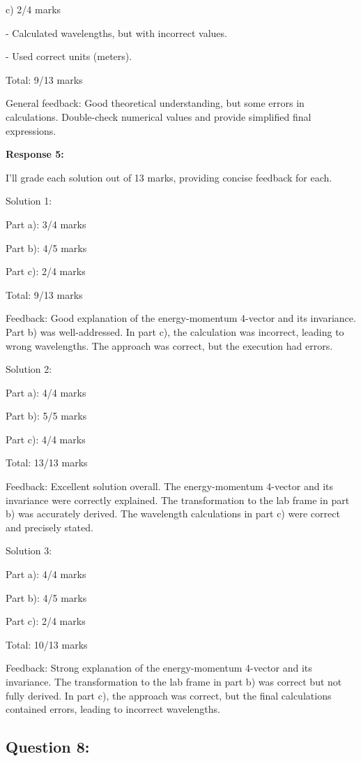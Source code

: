 \documentclass[a4paper,11pt]{article}
\begin{document}
c) 2/4 marks

- Calculated wavelengths, but with incorrect values.

- Used correct units (meters).

Total: 9/13 marks

General feedback: Good theoretical understanding, but some errors in calculations. Double-check numerical values and provide simplified final expressions.

\bigskip
\textbf{Response 5:}

I'll grade each solution out of 13 marks, providing concise feedback for each.

Solution 1:

Part a): 3/4 marks

Part b): 4/5 marks

Part c): 2/4 marks

Total: 9/13 marks

Feedback: Good explanation of the energy-momentum 4-vector and its invariance. Part b) was well-addressed. In part c), the calculation was incorrect, leading to wrong wavelengths. The approach was correct, but the execution had errors.

Solution 2:

Part a): 4/4 marks

Part b): 5/5 marks

Part c): 4/4 marks

Total: 13/13 marks

Feedback: Excellent solution overall. The energy-momentum 4-vector and its invariance were correctly explained. The transformation to the lab frame in part b) was accurately derived. The wavelength calculations in part c) were correct and precisely stated.

Solution 3:

Part a): 4/4 marks

Part b): 4/5 marks

Part c): 2/4 marks

Total: 10/13 marks

Feedback: Strong explanation of the energy-momentum 4-vector and its invariance. The transformation to the lab frame in part b) was correct but not fully derived. In part c), the approach was correct, but the final calculations contained errors, leading to incorrect wavelengths.

\subsection*{Question 8:}
\end{document}
